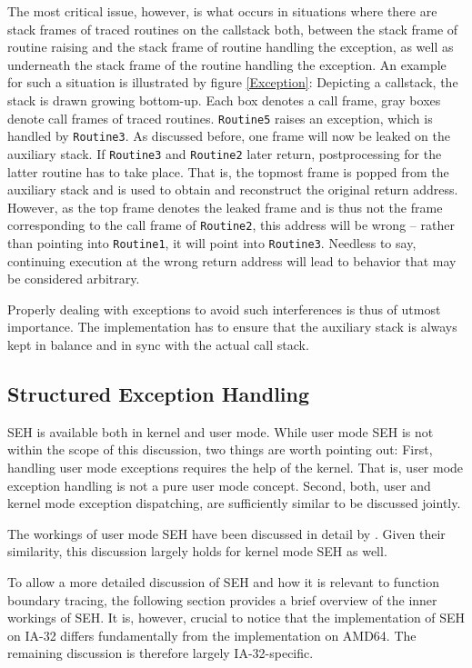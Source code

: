 The most critical issue, however, is what occurs in situations where there
are stack frames of traced routines on the callstack both, between the stack frame of routine raising and
the stack frame of routine handling the exception, as well as underneath the stack frame of the routine handling
the exception. An example for such a situation is illustrated by figure \ref{Exception}: 
Depicting a callstack, the stack is drawn growing bottom-up. Each box denotes a call frame,
gray boxes denote call frames of traced routines. \verb|Routine5| raises an
exception, which is handled by \verb|Routine3|. As discussed before, one
frame will now be leaked on the auxiliary stack. If \verb|Routine3| and
\verb|Routine2| later return, postprocessing for the latter routine has
to take place. That is, the topmost frame is popped from the auxiliary stack
and is used to obtain and reconstruct the original return address. However,
as the top frame denotes the leaked frame and is thus not the frame corresponding
to the call frame of \verb|Routine2|, this address will be wrong -- rather than
pointing into \verb|Routine1|, it will point into \verb|Routine3|. Needless to say,
continuing execution at the wrong return address will lead to behavior that may
be considered arbitrary.

Properly dealing with exceptions to avoid such interferences is thus of 
utmost importance. The implementation has to ensure that the auxiliary
stack is always kept in balance and in sync with the actual call stack.

\subsection{Structured Exception Handling}

SEH is available both in kernel and user mode. While user mode SEH is not
within the scope of this discussion, two things are worth pointing out: 
First, handling user mode exceptions requires the help of the kernel. That
is, user mode exception handling is not a pure user mode concept. Second,
both, user and kernel mode exception dispatching, are sufficiently similar to
be discussed jointly.

The workings of user mode SEH have been discussed in detail by \cite{Pietrek97}. 
Given their similarity, this discussion largely holds for kernel mode SEH as well. 

To allow a more detailed discussion of SEH and how it is relevant to 
function boundary tracing, the following section provides a brief overview 
of the inner workings of SEH. It is, however, crucial to notice that the
implementation of SEH on IA-32 differs fundamentally from the implementation
on AMD64. The remaining discussion is therefore largely IA-32-specific.

